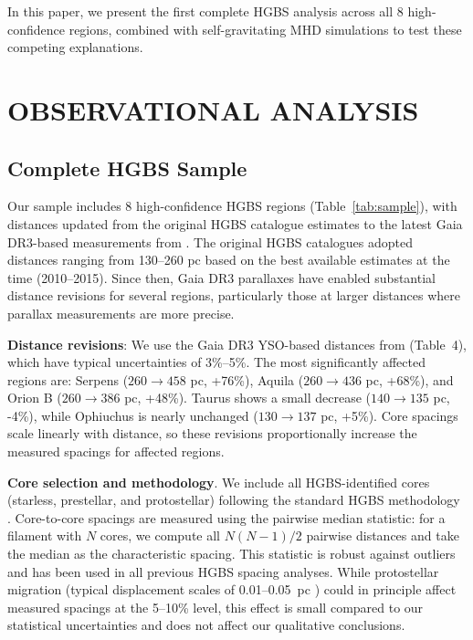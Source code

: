 \documentclass[twoside,twocolumn]{mnras}
\begin{document}
In this paper, we present the first complete HGBS analysis across all 8 high-confidence regions, combined with self-gravitating MHD simulations to test these competing explanations.

\section{OBSERVATIONAL ANALYSIS}

\subsection{Complete HGBS Sample}

Our sample includes 8 high-confidence HGBS regions (Table~\ref{tab:sample}), with distances updated from the original HGBS catalogue estimates to the latest Gaia DR3-based measurements from \citet{Zhang2023}. The original HGBS catalogues \citep{Konyves2015, Konyves2020, Andre2016, Ladjelate2020} adopted distances ranging from 130--260 pc based on the best available estimates at the time (2010--2015). Since then, Gaia DR3 parallaxes have enabled substantial distance revisions for several regions, particularly those at larger distances where parallax measurements are more precise.

\textbf{Distance revisions}: We use the Gaia DR3 YSO-based distances from \citet{Zhang2023} (Table~4), which have typical uncertainties of 3\%--5\%. The most significantly affected regions are: Serpens ($260 \to 458$ pc, +76\%), Aquila ($260 \to 436$ pc, +68\%), and Orion B ($260 \to 386$ pc, +48\%). Taurus shows a small decrease ($140 \to 135$ pc, -4\%), while Ophiuchus is nearly unchanged ($130 \to 137$ pc, +5\%). Core spacings scale linearly with distance, so these revisions proportionally increase the measured spacings for affected regions.

\textbf{Core selection and methodology}. We include all HGBS-identified cores (starless, prestellar, and protostellar) following the standard HGBS methodology \citep{Konyves2015, Konyves2020}. Core-to-core spacings are measured using the pairwise median statistic: for a filament with $N$ cores, we compute all $N(N-1)/2$ pairwise distances and take the median as the characteristic spacing. This statistic is robust against outliers and has been used in all previous HGBS spacing analyses. While protostellar migration (typical displacement scales of 0.01--0.05~pc \citep{Kirk2016, Mattern2018}) could in principle affect measured spacings at the 5--10\% level, this effect is small compared to our statistical uncertainties and does not affect our qualitative conclusions.
\end{document}
